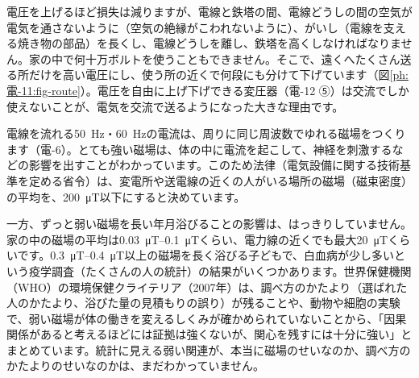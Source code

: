 電圧を上げるほど損失は減りますが、電線と鉄塔の間、電線どうしの間の空気が電気を通さないように（空気の絶縁がこわれないように）、がいし（電線を支える焼き物の部品）を長くし、電線どうしを離し、鉄塔を高くしなければなりません。家の中で何十万ボルトを使うこともできません。そこで、遠くへたくさん送る所だけを高い電圧にし、使う所の近くで何段にも分けて下げています（図\ref{ph:電-11:fig-route}）。電圧を自由に上げ下げできる変圧器（電-12 ⑤）は交流でしか使えないことが、電気を交流で送るようになった大きな理由です。

\begin{phmodel}[交流の電力と送電]
\end{phmodel}

\begin{phmada}
電線を流れる\qty{50}{Hz}・\qty{60}{Hz}の電流は、周りに同じ周波数でゆれる磁場をつくります（電-6）。とても強い磁場は、体の中に電流を起こして、神経を刺激するなどの影響を出すことがわかっています。このため法律（電気設備に関する技術基準を定める省令）は、変電所や送電線の近くの人がいる場所の磁場（磁束密度）の平均を、\qty{200}{\micro T}以下にすると決めています。

一方、ずっと弱い磁場を長い年月浴びることの影響は、はっきりしていません。家の中の磁場の平均は\qtyrange{0.03}{0.1}{\micro T}くらい、電力線の近くでも最大\qty{20}{\micro T}くらいです。\qtyrange{0.3}{0.4}{\micro T}以上の磁場を長く浴びる子どもで、白血病が少し多いという疫学調査（たくさんの人の統計）の結果がいくつかあります。世界保健機関（WHO）の環境保健クライテリア（2007年）は、調べ方のかたより（選ばれた人のかたより、浴びた量の見積もりの誤り）が残ることや、動物や細胞の実験で、弱い磁場が体の働きを変えるしくみが確かめられていないことから、「因果関係があると考えるほどには証拠は強くないが、関心を残すには十分に強い」とまとめています。統計に見える弱い関連が、本当に磁場のせいなのか、調べ方のかたよりのせいなのかは、まだわかっていません。
\end{phmada}

\phkokomade


